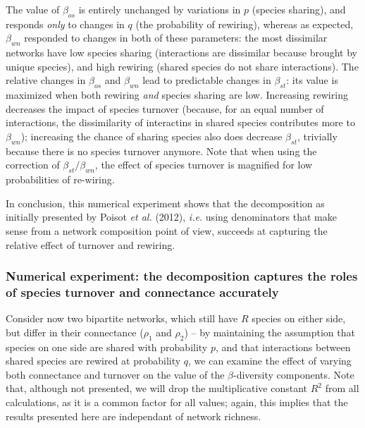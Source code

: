 \documentclass[11pt]{article}
\begin{document}
The value of \(\beta_{os}\) is entirely unchanged by variations in \(p\)
(species sharing), and responds \emph{only} to changes in \(q\) (the
probability of rewiring), whereas as expected, \(\beta_{wn}\) responded
to changes in both of these parameters: the most dissimilar networks
have low species sharing (interactions are dissimilar because brought by
unique species), and high rewiring (shared species do not share
interactions). The relative changes in \(\beta_{os}\) and \(\beta_{wn}\)
lead to predictable changes in \(\beta_{st}\): its value is maximized
when both rewiring \emph{and} species sharing are low. Increasing
rewiring decreases the impact of species turnover (because, for an equal
number of interactions, the dissimilarity of interactins in shared
species contributes more to \(\beta_{wn}\)); increasing the chance of
sharing species also does decrease \(\beta_{st}\), trivially because
there is no species turnover anymore. Note that when using the
correction of \(\beta_{st}/\beta_{wn}\), the effect of species turnover
is magnified for low probabilities of re-wiring.

In conclusion, this numerical experiment shows that the decomposition as
initially presented by Poisot \emph{et al.} (2012), \emph{i.e.} using
denominators that make sense from a network composition point of view,
succeeds at capturing the relative effect of turnover and rewiring.

\hypertarget{numerical-experiment-the-decomposition-captures-the-roles-of-species-turnover-and-connectance-accurately}{%
\subsubsection{Numerical experiment: the decomposition captures the
roles of species turnover and connectance
accurately}\label{numerical-experiment-the-decomposition-captures-the-roles-of-species-turnover-and-connectance-accurately}}

Consider now two bipartite networks, which still have \(R\) species on
either side, but differ in their connectance (\(\rho_1\) and \(\rho_2\))
-- by maintaining the assumption that species on one side are shared
with probability \(p\), and that interactions between shared species are
rewired at probability \(q\), we can examine the effect of varying both
connectance and turnover on the value of the \(\beta\)-diversity
components. Note that, although not presented, we will drop the
multiplicative constant \(R^2\) from all calculations, as it is a common
factor for all values; again, this implies that the results presented
here are independant of network richness.
\end{document}

